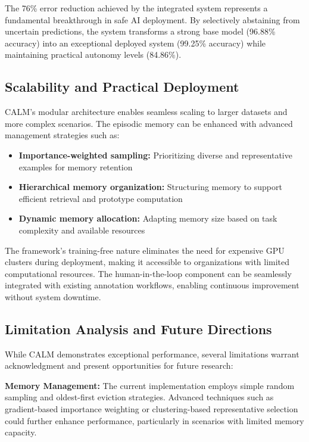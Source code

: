 \documentclass[conference]{IEEEtran}
\begin{document}
The 76\% error reduction achieved by the integrated system represents a fundamental breakthrough in safe AI deployment. By selectively abstaining from uncertain predictions, the system transforms a strong base model (96.88\% accuracy) into an exceptional deployed system (99.25\% accuracy) while maintaining practical autonomy levels (84.86\%).

\subsection{Scalability and Practical Deployment}

CALM's modular architecture enables seamless scaling to larger datasets and more complex scenarios. The episodic memory can be enhanced with advanced management strategies such as:

\begin{itemize}
\item \textbf{Importance-weighted sampling:} Prioritizing diverse and representative examples for memory retention
\item \textbf{Hierarchical memory organization:} Structuring memory to support efficient retrieval and prototype computation
\item \textbf{Dynamic memory allocation:} Adapting memory size based on task complexity and available resources
\end{itemize}

The framework's training-free nature eliminates the need for expensive GPU clusters during deployment, making it accessible to organizations with limited computational resources. The human-in-the-loop component can be seamlessly integrated with existing annotation workflows, enabling continuous improvement without system downtime.

\subsection{Limitation Analysis and Future Directions}

While CALM demonstrates exceptional performance, several limitations warrant acknowledgment and present opportunities for future research:

\textbf{Memory Management:} The current implementation employs simple random sampling and oldest-first eviction strategies. Advanced techniques such as gradient-based importance weighting or clustering-based representative selection could further enhance performance, particularly in scenarios with limited memory capacity.
\end{document}
